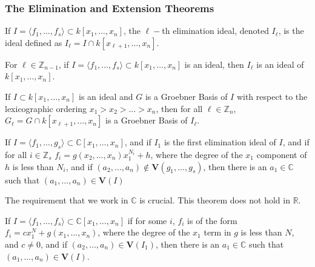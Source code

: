 \documentclass[crop=false,class=book,oneside]{standalone}
\begin{document}
\subsubsection{The Elimination and Extension Theorems}
\begin{definition}
If $I = \langle f_1,\hdots, f_s\rangle \subset k[x_1,\hdots ,x_n]$, the $\ell-$th elimination ideal, denoted $I_{\ell}$, is the ideal defined as $I_{\ell} = I \cap k[x_{\ell+1},\hdots, x_n]$.
\end{definition}
\begin{theorem}
For $\ell \in \mathbb{Z}_{n-1}$, if $I = \langle f_1,\hdots, f_s\rangle\subset k[x_1,\hdots ,x_n]$ is an ideal, then $I_{\ell}$ is an ideal of $k[x_1,\hdots ,x_n]$.
\end{theorem}
\begin{theorem}
If $I\subset k[x_1,\hdots ,x_n]$ is an ideal and $G$ is a Groebner Basis of $I$ with respect to the lexicographic ordering $x_1>x_2>\hdots > x_n$, then for all $\ell \in \mathbb{Z}_{n}$, $G_{\ell} = G\cap k[x_{\ell+1},\hdots, x_n]$ is a Groebner Basis of $I_{\ell}$.
\end{theorem}
\begin{theorem}
If $I = \langle f_1,\hdots, g_s\rangle \subset \mathbb{C}[x_1,\hdots ,x_n]$, and if $I_1$ is the first elimination ideal of $I$, and if for all $i\in \mathbb{Z}_s$ $f_i = g(x_2,\hdots, x_n)x_1^{N_i}+h$, where the degree of the $x_1$ component of $h$ is less than $N_i$, and if $(a_2,\hdots, a_n)\notin \textbf{V}(g_1,\hdots, g_s)$, then there is an $a_1 \in \mathbb{C}$ such that $(a_1,\hdots, a_n)\in \textbf{V}(I)$
\end{theorem}
\begin{remark}
The requirement that we work in $\mathbb{C}$ is crucial. This theorem does not hold in $\mathbb{R}$. 
\end{remark}
\begin{theorem}
If $I = \langle f_1,\hdots, f_s\rangle \subset \mathbb{C}[x_1,\hdots, x_n]$ if for some $i$, $f_i$ is of the form $f_i = cx_1^N + g(x_1,\hdots, x_n)$, where the degree of the $x_1$ term in $g$ is less than $N$, and $c \ne 0$, and if $(a_2,\hdots, a_n) \in \textbf{V}(I_{1})$, then there is an $a_1 \in \mathbb{C}$ such that $(a_1,\hdots, a_n) \in \textbf{V}(I)$.
\end{theorem}
\end{document}
